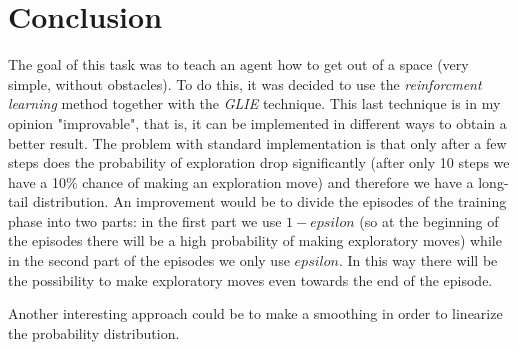\section{Conclusion}
The goal of this task was to teach an agent how to get out of a space (very simple, without obstacles). To do this, it was decided to use the \textit{reinforcment learning} method together with the \textit{GLIE} technique.
This last technique is in my opinion "improvable", that is, it can be implemented in different ways to obtain a better result. 
The problem with standard implementation is that only after a few steps does the probability of exploration drop significantly (after only 10 steps we have a 10\% chance of making an exploration move) and therefore we have a long-tail distribution. 
An improvement would be to divide the episodes of the training phase into two parts: in the first part we use $1 - epsilon$ (so at the beginning of the episodes there will be a high probability of making exploratory moves) while in the second part of the episodes we only use $epsilon$. In this way there will be the possibility to make exploratory moves even towards the end of the episode.

Another interesting approach could be to make a smoothing in order to linearize the probability distribution.